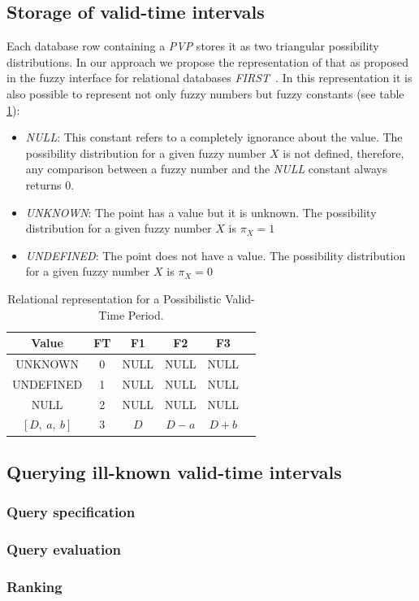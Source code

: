 \subsection{Storage of valid-time intervals}
Each database row containing a \emph{PVP} stores it as two triangular possibility distributions. In our approach we propose the representation of that as proposed in the  fuzzy interface for relational databases \emph{FIRST}~\cite{Medina94gefred.a,Gal98}. In this representation it is also possible to represent not only fuzzy numbers but fuzzy constants (see table \ref{table:relational-representation-pvp}):

\begin{itemize}
\item
\emph{NULL}: This constant refers to a completely ignorance about the value. The possibility distribution for a given fuzzy number $X$ is not defined, therefore, any comparison between a fuzzy number and the \emph{NULL} constant always returns $0$.
\item
\emph{UNKNOWN}: The point has a value but it is unknown. The possibility distribution for a given fuzzy number $X$ is $\pi_X=1$
\item
\emph{UNDEFINED}: The point does not have a value. The possibility distribution for a given fuzzy number $X$ is $\pi_X=0$
\end{itemize}


\begin{table}
\caption{Relational representation for a Possibilistic Valid-Time Period.}
\centering
\begin{tabular}{c c c c c c}
\hline
Value & FT & F1 & F2 & F3  \\ \hline
UNKNOWN & 0 & NULL & NULL & NULL  \\ 
UNDEFINED & 1 & NULL & NULL & NULL  \\ 
NULL & 2 & NULL & NULL & NULL  \\ 
$\left[D,\ a,\ b \right]$ & 3 & $D$ & $D-a$ & $D+b$ \\ 
\hline
\end{tabular}
\label{table:relational-representation-pvp}
\end{table}

\subsection{Querying ill-known valid-time intervals}

\subsubsection{Query specification}

\subsubsection{Query evaluation}

\subsubsection{Ranking}